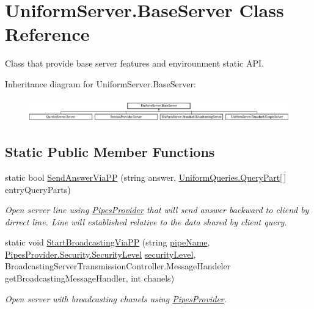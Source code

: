 \hypertarget{class_uniform_server_1_1_base_server}{}\section{Uniform\+Server.\+Base\+Server Class Reference}
\label{class_uniform_server_1_1_base_server}


Class that provide base server features and envirounment static A\+PI.  


Inheritance diagram for Uniform\+Server.\+Base\+Server\+:\begin{figure}[H]
\begin{center}
\leavevmode
\includegraphics[height=1.021898cm]{d7/d32/class_uniform_server_1_1_base_server}
\end{center}
\end{figure}
\subsection*{Static Public Member Functions}
\begin{DoxyCompactItemize}
\item 
static bool \mbox{\hyperlink{class_uniform_server_1_1_base_server_aefbb2a4287a7f995582b2abf41da8a89}{Send\+Answer\+Via\+PP}} (string answer, \mbox{\hyperlink{struct_uniform_queries_1_1_query_part}{Uniform\+Queries.\+Query\+Part}}\mbox{[}$\,$\mbox{]} entry\+Query\+Parts)
\begin{DoxyCompactList}\small\item\em Open server line using \mbox{\hyperlink{namespace_pipes_provider}{Pipes\+Provider}} that will send answer backward to cliend by dirrect line. Line will established relative to the data shared by client query. \end{DoxyCompactList}\item 
static void \mbox{\hyperlink{class_uniform_server_1_1_base_server_a9ca20516e2a562ddbf8d2c1866f90b25}{Start\+Broadcasting\+Via\+PP}} (string \mbox{\hyperlink{class_uniform_server_1_1_base_server_aaa318b3ed503dd8ccf381c9f3a81ecf2}{pipe\+Name}}, \mbox{\hyperlink{namespace_pipes_provider_1_1_security_a1a6020eca1c661a6f7140e8260502d7e}{Pipes\+Provider.\+Security.\+Security\+Level}} \mbox{\hyperlink{class_uniform_server_1_1_base_server_ac6297faa957fd1005fc61054bdd1cdb1}{security\+Level}}, Broadcasting\+Server\+Transmission\+Controller.\+Message\+Handeler get\+Broadcasting\+Message\+Handler, int chanels)
\begin{DoxyCompactList}\small\item\em Open server with broadcasting chanels using \mbox{\hyperlink{namespace_pipes_provider}{Pipes\+Provider}}. \end{DoxyCompactList}\end{DoxyCompactItemize}
